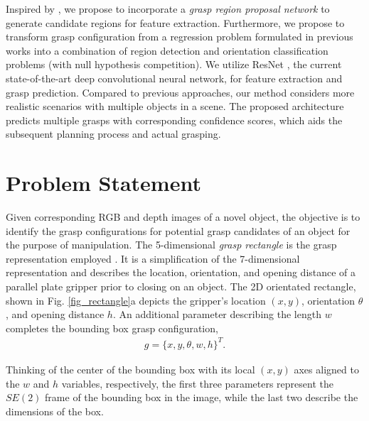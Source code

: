 \documentclass[letterpaper, 10 pt, journal, twoside]{IEEEtran}
\begin{document}
Inspired by \cite{ren2015faster}, we propose to incorporate a
\emph{grasp region proposal network} to generate candidate regions for feature
extraction.
Furthermore, we propose to transform grasp configuration from a
regression problem formulated in previous works \cite{redmon2015real,
kumra2016robotic} into a combination of region detection and orientation
classification problems (with null hypothesis competition). 
We utilize ResNet \cite{he2016deep}, the current state-of-the-art deep
convolutional neural network, for feature extraction and grasp
prediction.
Compared to previous approaches, our method considers more realistic
scenarios with multiple objects in a scene. The proposed architecture
predicts multiple grasps with corresponding confidence scores, which
aids the subsequent planning process and actual grasping.
 
\section{Problem Statement}
Given corresponding RGB and depth images of a novel object, the
objective is to identify the grasp configurations for potential grasp
candidates of an object for the purpose of manipulation.  
The 5-dimensional \emph{grasp rectangle} is the grasp representation employed
\cite{jiang2011efficient}.
It is a simplification of the 7-dimensional representation 
\cite{jiang2011efficient} and describes the location, orientation, and
opening distance of a parallel plate gripper prior to closing on an object. 
The 2D orientated rectangle, shown in Fig. \ref{fig_rectangle}a depicts
the gripper's location $(x,y)$, orientation $\theta$, and opening distance
$h$.  An additional parameter describing the length $w$ completes the
bounding box grasp configuration,
\begin{align} \label{eqn_grasp_representation}
  g = {\{x,y,\theta,w,h\}^T}.
\end{align}


Thinking of the center of the bounding box with its local $(x,y)$ axes
aligned to the $w$ and $h$ variables, respectively, the first three parameters
represent the $SE(2)$ frame of the bounding box in the image, while the last
two describe the dimensions of the box.
\end{document}
